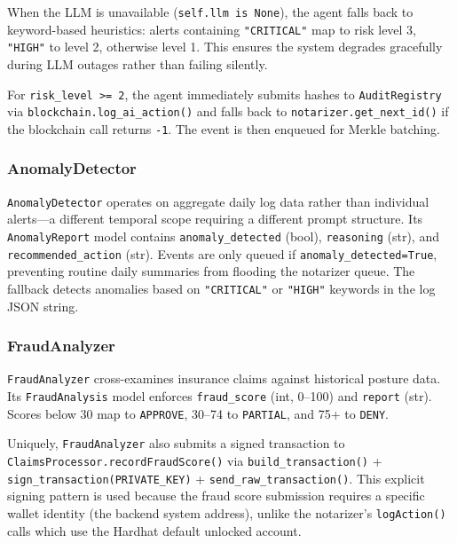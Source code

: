 \documentclass[12pt,a4paper]{article}
\begin{document}
When the LLM is unavailable (\texttt{self.llm is None}), the agent
falls back to keyword-based heuristics: alerts containing
\texttt{"CRITICAL"} map to risk level 3, \texttt{"HIGH"} to level 2,
otherwise level 1. This ensures the system degrades gracefully during
LLM outages rather than failing silently.

For \texttt{risk\_level >= 2}, the agent immediately submits hashes to
\texttt{AuditRegistry} via \texttt{blockchain.log\_ai\_action()} and
falls back to \texttt{notarizer.get\_next\_id()} if the blockchain call
returns \texttt{-1}. The event is then enqueued for Merkle batching.

\subsubsection{AnomalyDetector}
\label{sec:anomaly-detector}

\texttt{AnomalyDetector} operates on aggregate daily log data rather
than individual alerts---a different temporal scope requiring a different
prompt structure. Its \texttt{AnomalyReport} model contains
\texttt{anomaly\_detected} (bool), \texttt{reasoning} (str), and
\texttt{recommended\_action} (str). Events are only queued if
\texttt{anomaly\_detected=True}, preventing routine daily summaries
from flooding the notarizer queue. The fallback detects anomalies
based on \texttt{"CRITICAL"} or \texttt{"HIGH"} keywords in the log
JSON string.

\subsubsection{FraudAnalyzer}
\label{sec:fraud-analyzer}

\texttt{FraudAnalyzer} cross-examines insurance claims against historical
posture data. Its \texttt{FraudAnalysis} model enforces
\texttt{fraud\_score} (int, 0--100) and \texttt{report} (str).
Scores below 30 map to \texttt{APPROVE}, 30--74 to \texttt{PARTIAL},
and 75+ to \texttt{DENY}.

Uniquely, \texttt{FraudAnalyzer} also submits a signed transaction
to \texttt{ClaimsProcessor.recordFraudScore()} via
\texttt{build\_transaction()} + \texttt{sign\_transaction(PRIVATE\_KEY)}
+ \texttt{send\_raw\_transaction()}. This explicit signing pattern is
used because the fraud score submission requires a specific wallet
identity (the backend system address), unlike the notarizer's
\texttt{logAction()} calls which use the Hardhat default unlocked account.
\end{document}
